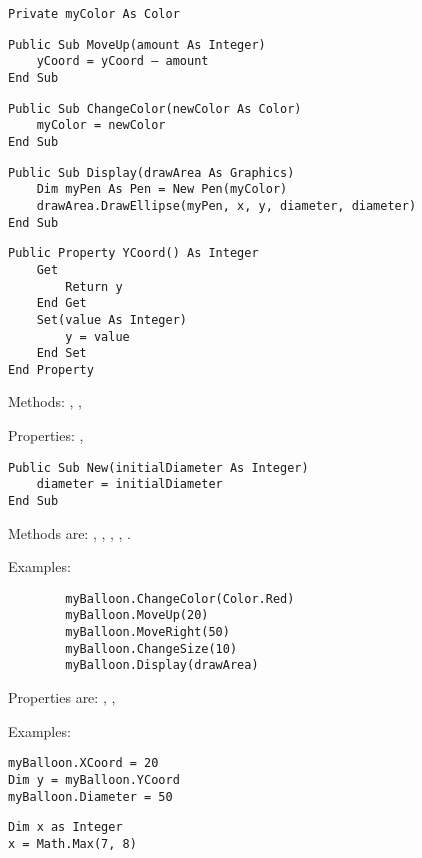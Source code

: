 		\begin{stab}
			\begin{enumChapter}
				\item
					\begin{lstlisting}
Private myColor As Color
					\end{lstlisting}
				\item
					\begin{lstlisting}
Public Sub MoveUp(amount As Integer)
	yCoord = yCoord – amount
End Sub
					\end{lstlisting}
				\item 
					\begin{lstlisting}
Public Sub ChangeColor(newColor As Color)
	myColor = newColor
End Sub
					\end{lstlisting}
				\item 
					\begin{lstlisting}
Public Sub Display(drawArea As Graphics)
	Dim myPen As Pen = New Pen(myColor)
	drawArea.DrawEllipse(myPen, x, y, diameter, diameter)
End Sub
					\end{lstlisting}
				\item 
					\begin{lstlisting}
Public Property YCoord() As Integer
	Get
		Return y
	End Get
	Set(value As Integer)
		y = value
	End Set
End Property
					\end{lstlisting}
				\item	Methods: , , 
				
					Properties: , 
				\item
					\begin{lstlisting}
Public Sub New(initialDiameter As Integer)
	diameter = initialDiameter
End Sub
					\end{lstlisting}
				\item	Methods are: , , , , .
					
					Examples:
					\begin{lstlisting}
		myBalloon.ChangeColor(Color.Red)
		myBalloon.MoveUp(20)
		myBalloon.MoveRight(50)
		myBalloon.ChangeSize(10)
		myBalloon.Display(drawArea)
					\end{lstlisting}
					Properties are: , , 
					
					Examples:
					\begin{lstlisting}
myBalloon.XCoord = 20
Dim y = myBalloon.YCoord
myBalloon.Diameter = 50
					\end{lstlisting}
					\item
					\begin{lstlisting}
Dim x as Integer
x = Math.Max(7, 8)
					\end{lstlisting}
			\end{enumChapter}
		\end{stab}

